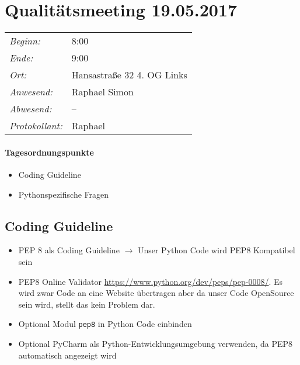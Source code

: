 \documentclass{scrartcl}
\date{19.05.2017}	%
\begin{document}
\maketitle
\section{Qualitätsmeeting 19.05.2017}	%
\begin{tabular}[t]{p{.25\linewidth} p{.25\linewidth}}
\emph{Beginn:}				& 8:00\\
\emph{Ende:}					& 9:00\\
\emph{Ort:}						& Hansastraße 32 4. OG Links\\
\emph{Anwesend:}	& 
Raphael\newline
Simon
\\
\emph{Abwesend:}		 & 
--
\\
\emph{Protokollant:}& Raphael
\end{tabular}
\paragraph{Tagesordnungspunkte}
\begin{itemize}
\item Coding Guideline
\item Pythonspezifische Fragen
\end{itemize}

\subsection{Coding Guideline}
\begin{itemize}
    \item PEP 8 als Coding Guideline $\rightarrow$ Unser Python Code wird PEP8 Kompatibel sein
    \item PEP8 Online Validator \url{https://www.python.org/dev/peps/pep-0008/}. Es wird zwar Code an eine Website übertragen aber da unser Code OpenSource sein wird, stellt das kein Problem dar.
    \item Optional Modul \texttt{pep8} in Python Code einbinden
    \item Optional PyCharm als Python-Entwicklungsumgebung verwenden, da PEP8 automatisch angezeigt wird
\end{itemize}
\end{document}
